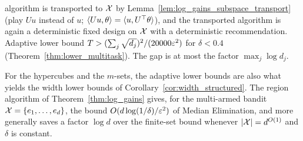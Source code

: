 \begin{remark}
\begin{itemize}
        algorithm is transported to $\mathcal{X}$ by Lemma~\ref{lem:log_gains_subspace_transport}
        (play $Uu$ instead of $u$; $\langle Uu, \theta \rangle = \langle u, U^\top\theta \rangle$), and the transported
        algorithm is again a deterministic fixed design on $\mathcal{X}$ with a deterministic
        recommendation. Adaptive lower bound
        $T > (\sum_j\sqrt{d_j})^2/(20000\varepsilon^2)$ for $\delta < 0.4$
        (Theorem~\ref{thm:lower_multitask}). The gap is at most the factor $\max_j\log d_j$.
\end{itemize}
For the hypercubes and the $m$-sets, the adaptive lower bounds are also what yields the
width lower bounds of Corollary~\ref{cor:width_structured}. The region algorithm of
Theorem~\ref{thm:log_gains} gives, for the multi-armed bandit $\mathcal{X} = \{e_1,\dots,e_d\}$, the
bound $O(d\log(1/\delta)/\varepsilon^2)$ of Median Elimination, and more generally saves a factor
$\log d$ over the finite-set bound whenever $\lvert \mathcal{X} \rvert = d^{O(1)}$ and $\delta$ is constant.
\end{remark}
